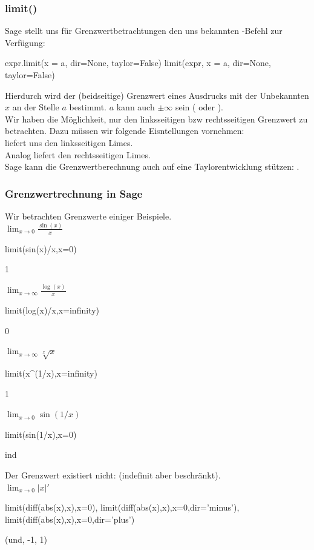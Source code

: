 \documentclass[fontsize=12pt,paper=a4,twoside,bibtotoc,idxtotoc,
liststotoc,pagesize,BCOR1.2cm,DIV15,chapterprefix,pagesize=pdftex]{scrbook}
\theoremstyle{plain}
\theoremstyle{definition}
\theoremstyle{remark}
\begin{document}
\subsubsection{limit()}
Sage stellt uns für Grenzwertbetrachtungen den uns bekannten -Befehl zur Verfügung:
\begin{sagein}
expr.limit(x = a, dir=None, taylor=False)
limit(expr, x = a, dir=None, taylor=False)
\end{sagein}
Hierdurch wird der (beidseitige) Grenzwert eines Ausdrucks mit der Unbekannten $x$ an
der Stelle $a$ bestimmt. $a$ kann auch $\pm \infty$ sein ( oder ).\\
Wir haben die Möglichkeit, nur den linksseitigen bzw rechtsseitigen Grenzwert zu betrachten. Dazu müssen wir folgende Eisntellungen vornehmen:\\
 liefert uns den linksseitigen Limes.\\ 
Analog liefert  den rechtsseitigen Limes.\\
Sage kann die Grenzwertberechnung auch auf eine Taylorentwicklung stützen: . 
\subsubsection{Grenzwertrechnung in Sage}
Wir betrachten Grenzwerte einiger Beispiele.\\
$\lim_{x \rightarrow 0}
\frac{\sin(x)}{x}$
\begin{sagein}
limit(sin(x)/x,x=0)
\end{sagein}
\begin{sageout}
  1
\end{sageout}
$\lim_{x \rightarrow \infty}
\frac{\log(x)}{x}$
\begin{sagein}
limit(log(x)/x,x=infinity)
\end{sagein}
\begin{sageout}
  0
\end{sageout}
$\lim_{x \rightarrow \infty} \sqrt[x]{x}$
\begin{sagein}
limit(x^(1/x),x=infinity)
\end{sagein}
\begin{sageout}
  1
\end{sageout}
$\lim_{x \rightarrow 0}
\sin(1/x)$
\begin{sagein}
limit(sin(1/x),x=0)
\end{sagein}
\begin{sageout}
  ind
\end{sageout}
Der Grenzwert existiert nicht:  (indefinit aber beschränkt).\\ 
$\lim_{x \rightarrow 0} |x|' $
\begin{sagein}
limit(diff(abs(x),x),x=0),
limit(diff(abs(x),x),x=0,dir='minus'),
limit(diff(abs(x),x),x=0,dir='plus')
\end{sagein}
\begin{sageout}
  (und, -1, 1)
\end{sageout}
\end{document}
